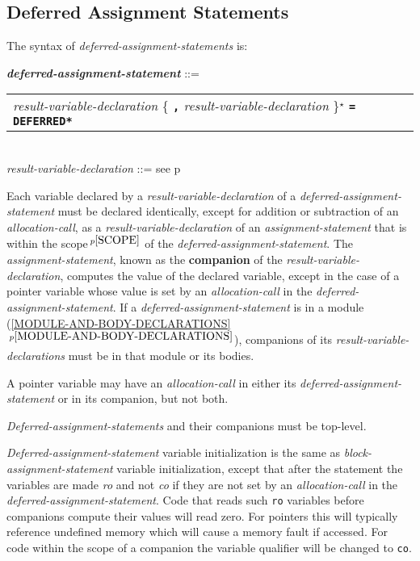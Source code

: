 \documentclass[12pt]{article}
\newcommand{\TT}[1]{{\tt \bfseries #1}}
\newcommand{\STAR}{{\Large $^\star$}}
\newcommand{\key}[1]{{\rm \bfseries #1}}
\newcommand{\ttkey}[1]{{\tt \bfseries #1}}
\newcommand{\emkey}[1]{{\em \bfseries #1}}
\newcommand{\itemref}[1]{\ref{#1}$\,^{p\pageref{#1}}$}
\newcommand{\pagref}[1]{p\pageref{#1}}
\newcommand{\pagnote}[1]{$\,^{p\pageref{#1}}$}
\newenvironment{indpar}[1][0.3in]%
	{\begin{list}{}%
		     {\setlength{\itemsep}{0in}%
		      \setlength{\topsep}{0in}%
		      \setlength{\parsep}{1ex}%
		      \setlength{\labelwidth}{#1}%
		      \setlength{\leftmargin}{#1}%
		      \addtolength{\leftmargin}{\labelsep}}%
	 \item}%
	{\end{list}}
\begin{document}
\subsection{Deferred Assignment Statements}
\label{DEFERRED-ASSIGNMENT-STATEMENTS}

The syntax of {\em defer\-red-assignment-state\-ments} is:

\begin{indpar}
\emkey{deferred-assignment-statement} ::= \\
\hspace*{0.3in}
    \begin{tabular}[t]{@{}l}
        {\em result-variable-declaration}
                \{ \TT{,} {\em result-variable-declaration} \}\STAR{}
		     \TT{=} \ttkey{*DEFERRED*} \\
    \end{tabular}
\\[0.5ex]
{\em result-variable-declaration} ::=
    see \pagref{RESULT-VARIABLE-DECLARATION}
\end{indpar}

Each variable declared by a {\em result-variable-declaration}
of a {\em deferred-assignment-statement} must be declared identically,
except for addition or subtraction of an {\em allocation-call},
as a {\em result-variable-declaration} of an {\em assignment-statement}
that is within the scope\pagnote{SCOPE} of the
{\em deferred-assignment-statement}.  The {\em assignment-statement},
known as the \key{companion} of the {\em result-variable-declaration},
computes the value of the
declared variable, except in the case of a pointer variable whose value is
set by an {\em allocation-call} in the {\em deferred-assignment-statement}.
If a {\em deferred-assignment-statement} is in a module
(\itemref{MODULE-AND-BODY-DECLARATIONS}), companions
of its {\em result-variable-declarations}
must be in that module or its bodies.

A pointer variable may have an {\em allocation-call} in either its
{\em deferred-assignment-statement} or in its companion, but not
both.

{\em Deferred-assignment-statements} and their companions must be
top-level.

{\em Deferred-assignment-statement} variable initialization is the
same as {\em block-assignment-state\-ment} variable initialization,
except that after the statement the variables
are made {\em ro} and not {\em co} if they are not set
by an {\em allocation-call} in the {\em deferred-assignment-statement}.
Code that reads such {\tt ro} variables
before companions compute their values will
read zero.
For pointers this will typically reference undefined memory which
will cause a memory fault if accessed.
For code within the scope of a companion the
variable qualifier will be changed to {\tt co}.
\end{document}
